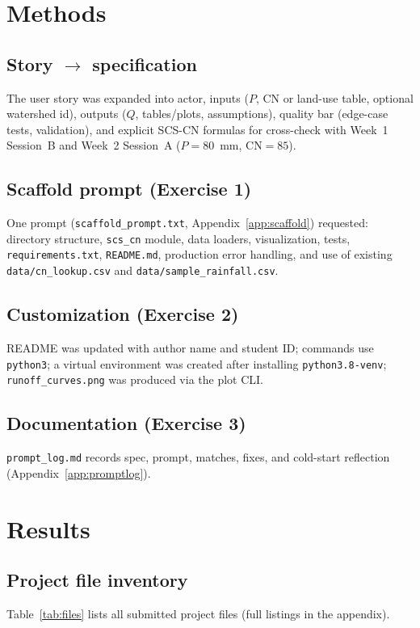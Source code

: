 \documentclass[11pt,a4paper]{article}
\begin{document}
\section{Methods}

\subsection{Story $\rightarrow$ specification}
The user story was expanded into actor, inputs ($P$, CN or land-use table, optional watershed id), outputs ($Q$, tables/plots, assumptions), quality bar (edge-case tests, validation), and explicit SCS-CN formulas for cross-check with Week~1 Session~B and Week~2 Session~A ($P=80$~mm, $\mathrm{CN}=85$).

\subsection{Scaffold prompt (Exercise 1)}
One prompt (\texttt{scaffold\_prompt.txt}, Appendix~\ref{app:scaffold}) requested: directory structure, \texttt{scs\_cn} module, data loaders, visualization, tests, \texttt{requirements.txt}, \texttt{README.md}, production error handling, and use of existing \texttt{data/cn\_lookup.csv} and \texttt{data/sample\_rainfall.csv}.

\subsection{Customization (Exercise 2)}
README was updated with author name and student ID; commands use \texttt{python3}; a virtual environment was created after installing \texttt{python3.8-venv}; \texttt{runoff\_curves.png} was produced via the plot CLI.

\subsection{Documentation (Exercise 3)}
\texttt{prompt\_log.md} records spec, prompt, matches, fixes, and cold-start reflection (Appendix~\ref{app:promptlog}).

\section{Results}

\subsection{Project file inventory}
Table~\ref{tab:files} lists all submitted project files (full listings in the appendix).
\end{document}
